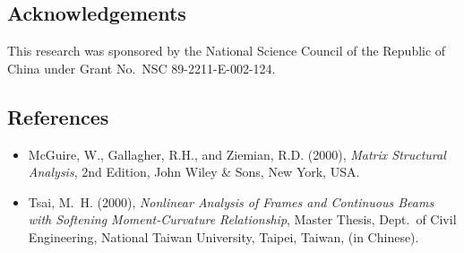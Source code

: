 \subsection*{Acknowledgements}
This research was sponsored by the National Science Council of the Republic of China under Grant No.\ NSC 89-2211-E-002-124.

\subsection*{References}
\begin{itemize}[leftmargin=*]
  \item McGuire, W., Gallagher, R.H., and Ziemian, R.D. (2000), \emph{Matrix Structural Analysis}, 2nd Edition, John Wiley \& Sons, New York, USA.
  \item Tsai, M.~H. (2000), \emph{Nonlinear Analysis of Frames and Continuous Beams with Softening Moment-Curvature Relationship}, Master Thesis, Dept.\ of Civil Engineering, National Taiwan University, Taipei, Taiwan, (in Chinese).
\end{itemize}
